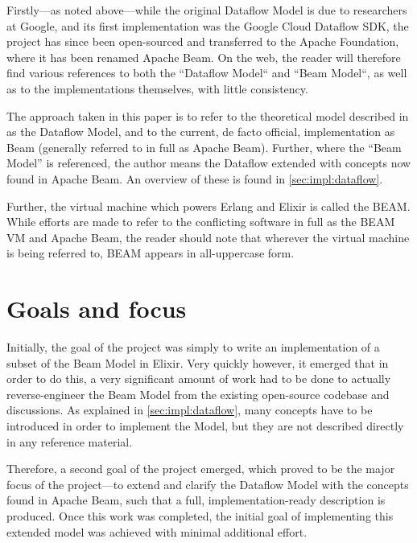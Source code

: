 Firstly---as noted above---while the original Dataflow Model is due to researchers at Google, and its first implementation was the Google Cloud Dataflow SDK, the project has since been open-sourced and transferred to the Apache Foundation, where it has been renamed Apache Beam.
On the web, the reader will therefore find various references to both the ``Dataflow Model`` and ``Beam Model``, as well as to the implementations themselves, with little consistency.

The approach taken in this paper is to refer to the theoretical model described in \cite{Akidau:2015} as the Dataflow Model, and to the current, de facto official, implementation \cite{ApacheBeam} as Beam (generally referred to in full as Apache Beam).
Further, where the ``Beam Model'' is referenced, the author means the Dataflow extended with concepts now found in Apache Beam.
An overview of these is found in \cref{sec:impl:dataflow}.

Further, the virtual machine which powers Erlang and Elixir is called the BEAM.
While efforts are made to refer to the conflicting software in full as the BEAM VM and Apache Beam, the reader should note that wherever the virtual machine is being referred to, BEAM appears in all-uppercase form.

\section{Goals and focus}\label{sec:intro:goals}

Initially, the goal of the project was simply to write an implementation of a subset of the Beam Model in Elixir.
Very quickly however, it emerged that in order to do this, a very significant amount of work had to be done to actually reverse-engineer the Beam Model from the existing open-source codebase and discussions.
As explained in \cref{sec:impl:dataflow}, many concepts have to be introduced in order to implement the Model, but they are not described directly in any reference material.

Therefore, a second goal of the project emerged, which proved to be the major focus of the project---to extend and clarify the Dataflow Model with the concepts found in Apache Beam, such that a full, implementation-ready description is produced.
Once this work was completed, the initial goal of implementing this extended model was achieved with minimal additional effort.

